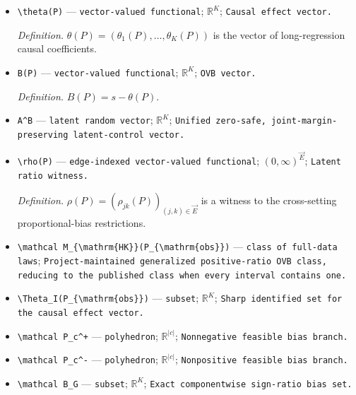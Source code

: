 \documentclass{article}
\begin{document}
\begin{itemize}
  \item \texttt{\textbackslash{}\allowbreak{}theta(P)} --- \texttt{vector-\allowbreak{}valued functional}; \(\mathbb R^K\); \texttt{Causal effect vector.}
  \par\smallskip\noindent\emph{Definition.} \(\theta(P)=(\theta_1(P),\ldots,\theta_K(P))\) is the vector of long-regression causal coefficients.
  \item \texttt{B(P)} --- \texttt{vector-\allowbreak{}valued functional}; \(\mathbb R^K\); \texttt{OVB vector.}
  \par\smallskip\noindent\emph{Definition.} \(B(P)=s-\theta(P)\).
  \item \texttt{A\textasciicircum{}B} --- \texttt{latent random vector}; \(\mathbb R^K\); \texttt{Unified zero-\allowbreak{}safe,\allowbreak{} joint-\allowbreak{}margin-\allowbreak{}preserving latent-\allowbreak{}control vector.}
  \item \texttt{\textbackslash{}\allowbreak{}rho(P)} --- \texttt{edge-\allowbreak{}indexed vector-\allowbreak{}valued functional}; \((0,\infty)^{\vec E}\); \texttt{Latent ratio witness.}
  \par\smallskip\noindent\emph{Definition.} \(\rho(P)=(\rho_{jk}(P))_{(j,k)\in\vec E}\) is a witness to the cross-setting proportional-bias restrictions.
  \item \texttt{\textbackslash{}\allowbreak{}mathcal M\_\allowbreak{}\{\textbackslash{}\allowbreak{}mathrm\{HK\}\allowbreak{}\}\allowbreak{}(P\_\allowbreak{}\{\textbackslash{}\allowbreak{}mathrm\{obs\}\allowbreak{}\}\allowbreak{})} --- \texttt{class of full-\allowbreak{}data laws}; \texttt{Project-\allowbreak{}maintained generalized positive-\allowbreak{}ratio OVB class,\allowbreak{} reducing to the published class when every interval contains one.}
  \item \texttt{\textbackslash{}\allowbreak{}Theta\_\allowbreak{}I(P\_\allowbreak{}\{\textbackslash{}\allowbreak{}mathrm\{obs\}\allowbreak{}\}\allowbreak{})} --- \texttt{subset}; \(\mathbb R^K\); \texttt{Sharp identified set for the causal effect vector.}
  \item \texttt{\textbackslash{}\allowbreak{}mathcal P\_\allowbreak{}c\textasciicircum{}+\allowbreak{}} --- \texttt{polyhedron}; \(\mathbb R^{|c|}\); \texttt{Nonnegative feasible bias branch.}
  \item \texttt{\textbackslash{}\allowbreak{}mathcal P\_\allowbreak{}c\textasciicircum{}-\allowbreak{}} --- \texttt{polyhedron}; \(\mathbb R^{|c|}\); \texttt{Nonpositive feasible bias branch.}
  \item \texttt{\textbackslash{}\allowbreak{}mathcal B\_\allowbreak{}G} --- \texttt{subset}; \(\mathbb R^K\); \texttt{Exact componentwise sign-\allowbreak{}ratio bias set.}

\end{itemize}
\end{document}
